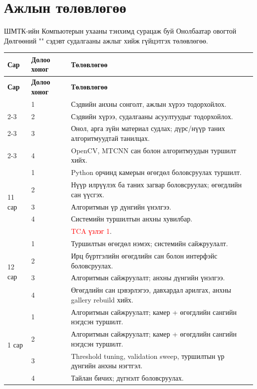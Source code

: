 \chapter{Ажлын төлөвлөгөө}
ШМТК-ийн Компьютерын ухааны тэнхимд сурацаж буй Онолбаатар овогтой Дөлгөөний "\titlename" сэдэвт 
судалгааны ажлыг хийж гүйцэтгэх төлөвлөгөө.

\setlength{\arrayrulewidth}{0.4pt}
\begin{longtable}{|p{2.2cm}|p{2cm}|p{10.5cm}|}
\hline
\textbf{Сар} & \textbf{Долоо хоног} & \textbf{Төлөвлөгөө} \\
\hline
\endfirsthead
\hline
\textbf{Сар} & \textbf{Долоо хоног} & \textbf{Төлөвлөгөө} \\
\hline
\endhead
\hline
\endfoot

\multirow{4}{*}{10 сар} & 1 & Сэдвийн анхны сонголт, ажлын хүрээ тодорхойлох. \\
\cline{2-3}
& 2 & Сэдвийн хүрээ, судалгааны асуултуудыг тодорхойлох. \\
\cline{2-3}
& 3 & Онол, арга зүйн материал судлах; дүрс/нүүр таних алгоритмуудтай танилцах. \\
\cline{2-3}
& 4 & OpenCV, MTCNN сан болон алгоритмуудын туршилт хийх. \\
\hline

\multirow{5}{*}{11 сар} & 1 & Python орчинд камерын өгөгдөл боловсруулах туршилт. \\
\cline{2-3}
& 2 & Нүүр илрүүлэх ба таних загвар боловсруулах; өгөгдлийн сан үүсгэх. \\
\cline{2-3}
& 3 & Алгоритмын үр дүнгийн үнэлгээ. \\
\cline{2-3}
& 4 & Системийн туршилтын анхны хувилбар. \\
\cline{2-3}
&  & \textcolor{red}{TCA үзлэг 1}. \\
\hline

\multirow{4}{*}{12 сар} & 1 & Туршилтын өгөгдөл нэмэх; системийн сайжруулалт. \\
\cline{2-3}
& 2 & Ирц бүртгэлийн өгөгдлийн сан болон интерфэйс боловсруулах. \\
\cline{2-3}
& 3 & Алгоритмын сайжруулалт; анхны дүнгийн үнэлгээ. \\
\cline{2-3}
& 4 & Өгөгдлийн сан цэвэрлэгээ, давхардал арилгах, анхны gallery rebuild хийх. \\
\hline

\multirow{4}{*}{1 сар} & 1 & Алгоритмын сайжруулалт; камер + өгөгдлийн сангийн нэгдсэн туршилт. \\
\cline{2-3}
& 2 & Алгоритмын сайжруулалт; камер + өгөгдлийн сангийн нэгдсэн туршилт. \\
\cline{2-3}
& 3 & Threshold tuning, validation sweep, туршилтын үр дүнгийн анхны нэгтгэл. \\
\cline{2-3}
& 4 & Тайлан бичих; дүгнэлт боловсруулах. \\
\hline


\end{longtable}
